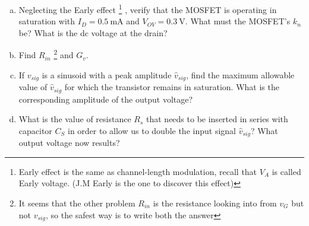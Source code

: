 \documentclass[12pt, a4paper]{article}
\begin{document}
\begin{enumerate}[(a)]
  \item Neglecting the Early effect \footnote{Early effect is the same as channel-length modulation, recall that $V_A$ is called Early voltage. (J.M Early is the one to discover this effect)}
    , verify that the MOSFET is operating in saturation with $I_D = \SI{0.5}{\mA}$  and $V_{OV} = \SI{0.3}{\V}$. What must the MOSFET's $k_n$ be? What is the dc voltage at the drain?
  \item Find $R_{in}$ \footnote{It seems that the other problem $R_{in}$ is the resistance looking into from $v_G$ but not $v_{sig}$, so the safest way is to write both the answer}
    and $G_v$.
  \item If $v_{sig}$ is a sinusoid with a peak amplitude $\hat{v}_{sig}$, find the maximum allowable value of $\hat{v}_{sig}$ for which the transistor remains in saturation. What is the corresponding amplitude of the output voltage?
  \item What is the value of resistance $R_s$ that needs to be inserted in series with capacitor $C_S$ in order to allow us to double the input signal $\hat{v}_{sig}$? What output voltage now results?
\end{enumerate}
\end{document}
